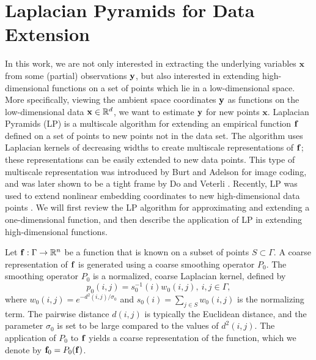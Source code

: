 \section{Laplacian Pyramids for Data Extension} \label{sec:LapPyr}

In this work, we are not only interested in extracting the underlying variables $\mathbf{x}$ from some (partial) observations $\mathbf{y}$,
but also interested in extending high-dimensional functions on a set of points which lie in a low-dimensional space.
%
More specifically, viewing the ambient space coordinates $\mathbf{y}$ as functions on the low-dimensional data $\mathbf{x} \in \mathbb{R}^d$,
we want to estimate $\mathbf{y}$ for new points $\mathbf{x}$.
%
Laplacian Pyramids (LP) is a multiscale algorithm for extending an empirical function $\mathbf{f}$ defined on a set of points
to new points not in the data set.
%
The algorithm uses Laplacian kernels of decreasing widths to create multiscale representations of $\mathbf{f}$;
these representations can be easily extended to new data points.
%
This type of multiscale representation was introduced by Burt and Adelson \cite{burt1983laplacian} for image coding,
and was later shown to be a tight frame by Do and Veterli \cite{do2003framing}.
%
Recently, LP was used to extend nonlinear embedding coordinates to new high-dimensional data points \cite{rabin2012heterogeneous}.
%
We will first review the LP algorithm for approximating and extending a one-dimensional function,
and then describe the application of LP in extending high-dimensional functions.

Let $\mathbf{f}: \Gamma \rightarrow \mathbb{R}^n$ be a function that is known on a subset of points $S \subset \Gamma$.
%
A coarse representation of $\mathbf{f}$ is generated using a coarse smoothing operator $P_0$.
%
The smoothing operator $P_0$ is a normalized, coarse Laplacian kernel, defined by
\begin{equation}
p_0(i, j)= s_0^{-1}(i)w_0(i, j),\: i, j \in \Gamma,
\end{equation}
where $w_0(i, j)=e^{-d^2(i, j) / \sigma_0}$ and $s_0(i)=\sum_{j \in S}w_0(i, j)$ is the normalizing term.
%
The pairwise distance $d(i, j)$ is typically the Euclidean distance, and the parameter $\sigma_0$ is set to be large compared to the values of $d^2(i, j)$.
%
The application of $P_0$ to $\mathbf{f}$ yields a coarse representation of the function, which we denote by $\mathbf{f}_0=P_0(\mathbf{f})$.


